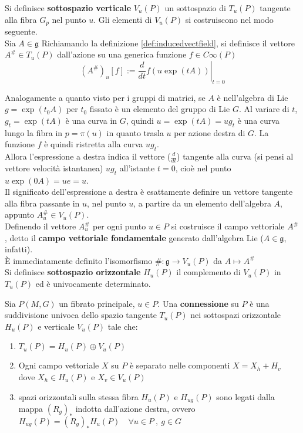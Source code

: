 Si definisce \textbf{sottospazio verticale} $V_u(P)$ un sottospazio di $T_u(P)$
tangente alla fibra $G_p$ nel punto $u$. Gli elementi di $V_u(P)$ si costruiscono
nel modo seguente.\\
Sia $A \in \mathfrak{g}$
Richiamando la definizione \ref{def:inducedvectfield}, si definisce il vettore
$A^\# \in T_u(P)$ dall'azione su una generica funzione $f \in C\infty(P)$
$$
   (A^\#)_u [f] := \left. \frac{d}{dt} f(u \exp(tA)) \right|_{t=0}
$$

Analogamente a quanto visto per i gruppi di matrici, se $A$ è nell'algebra di Lie
$g = \exp(t_0 A)$ per $t_0$ fissato è un elemento del gruppo di Lie $G$.
Al variare di $t$, $g_t = \exp(tA)$ è una curva in $G$, quindi $u = \exp(tA) = ug_t$
è una curva lungo la fibra in $p = \pi(u)$ in quanto trasla $u$ per azione
destra di $G$. La funzione $f$ è quindi ristretta alla curva $ug_t$. \\
Allora  l'espressione a destra indica il vettore ($\frac{d}{dt}$) tangente alla curva
(si pensi al vettore velocità istantanea) $ug_t$ all'istante $t=0$, cioè nel punto
$u\exp(0A) = ue = u$.\\
Il significato dell'espressione a destra è esattamente definire
un vettore tangente alla fibra passante in $u$, nel punto $u$, a partire da
un elemento dell'algebra $A$, appunto $A^\#_u \in V_u(P)$.\\

Definendo il vettore $A^\#_u$ per ogni punto $u \in P$ si costruisce il campo
vettoriale $A^\#$, detto il \textbf{campo vettoriale fondamentale} generato
dall'algebra Lie ($A \in \mathfrak{g}$, infatti).\\
È immediatamente definito l'isomorfismo $\# : \mathfrak{g} \to V_u(P)$ da $A \mapsto A^\#$\\

Si definisce \textbf{sottospazio orizzontale} $H_u(P)$ il complemento di $V_u(P)$
in $T_u(P)$ ed è univocamente determinato.

\begin{definition}\label{def:prbundleconnection}
   Sia $P(M,G)$ un fibrato principale, $u \in P$. Una \textbf{connessione} su $P$ è una
   suddivisione univoca dello spazio tangente $T_u(P)$ nei sottospazi orizzontale $H_u(P)$
   e verticale $V_u(P)$ tale che:
   \begin{enumerate}
      \item $T_u(P) = H_u(P) \oplus V_u(P)$
      \item Ogni campo vettoriale $X$ su $P$ è separato nelle componenti $X = X_h + H_v$ \\
      dove $X_h \in H_u(P)$ e $X_v \in V_u(P)$
      \item spazi orizzontali sulla stessa fibra $H_u(P)$ e $H_{ug}(P)$ sono legati
      dalla mappa $(R_g)_*$ indotta dall'azione destra, ovvero
      $ H_{ug}(P) = (R_g)_* H_u(P) \quad \forall u \in P \: , \: g\in G$
   \end{enumerate}
\end{definition}

